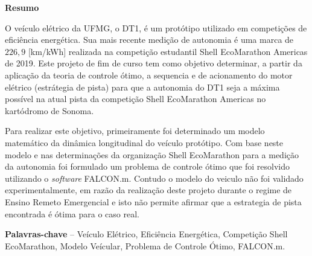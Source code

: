 
\begin{center}
\huge{{\bf Resumo}}
\vspace{2cm}
\end{center}

 

O veículo elétrico da UFMG, o DT1, é um protótipo utilizado em competições de eficiência energética.
Sua mais recente medição de autonomia é uma marca de $226,9$ [km/kWh] realizada na competição estudantil Shell EcoMarathon Americas de 2019.
Este projeto de fim de curso tem como objetivo determinar, a partir da aplicação da teoria de controle ótimo, a sequencia e de acionamento do motor 
elétrico (estrátegia de pista) para que a autonomia do DT1 seja a máxima possível na atual pista da competição Shell EcoMarathon Americas no kartódromo de Sonoma.

Para realizar este objetivo, primeiramente foi determinado um modelo matemático da dinâmica longitudinal do veículo protótipo. Com base neste modelo
e nas determinações da organização Shell EcoMarathon para a medição da autonomia foi formulado um problema de controle ótimo que foi resolvido utilizando o
\textit{software} FALCON.m. Contudo o modelo do veiculo não foi validado experimentalmente, em razão da realização deste projeto durante o regime de Ensino
Remeto Emergencial e isto não permite afirmar que a estrategia de pista encontrada é ótima para o caso real.
 
\textbf{Palavras-chave} -- Veículo Elétrico, Eficiência Energética, Competição Shell EcoMarathon, Modelo Veícular, Problema de Controle Ótimo, FALCON.m.

\clearpage
\thispagestyle{empty}
\cleardoublepage

